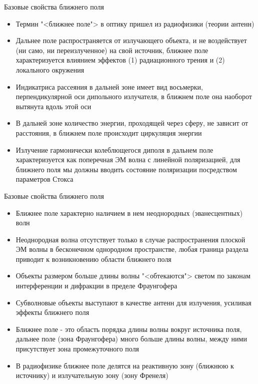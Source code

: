 \documentclass[9pt, compress, xcolor=table]{beamer}
\begin{document}
\begin{frame}{Базовые свойства ближнего поля}

\begin{itemize}
\item Термин "<ближнее поле"> в оптику пришел из радиофизики (теории антенн)
\item Дальнее поле распространяется от излучающего объекта, и не воздействует (ни само, ни переизлученное) на свой источник, ближнее поле характеризуется влиянием эффектов (1) радиационного трения и (2) локального окружения
\item Индикатриса рассеяния в дальней зоне имеет вид восьмерки, перпендикулярной оси дипольного излучателя, в ближнем поле она наоборот вытянута вдоль этой оси
\item В дальней зоне количество энергии, проходящей через сферу, не зависит от расстояния, в ближнем поле происходит циркуляция энергии
\item Излучение гармонически колеблющегося диполя в дальнем поле характеризуется как поперечная ЭМ волна с линейной поляризацией, для ближнего поля мы должны вводить состояние поляризации посредством параметров Стокса
\end{itemize}


\end{frame}

\begin{frame}{Базовые свойства ближнего поля}

\begin{itemize}

\item Ближнее поле характерно наличием в нем неоднородных (эванесцентных) волн
\item Неоднородная волна отсутствует только в случае распространения плоской ЭМ волны в бесконечном однородном пространстве, любая граница раздела приводит к возникновению области ближнего поля
\item Объекты размером больше длины волны "<обтекаются"> светом по законам интерференции и дифракции в пределе Фраунгофера
\item Субволновые объекты выступают в качестве антенн для излучения, усиливая эффекты ближнего поля
\item Ближнее поле - это область порядка длины волны вокруг источника поля, дальнее поле (зона Фраунгофера) много больше длины волны, между ними присутствует зона промежуточного поля
\item В радиофизике ближнее поле делятся на реактивную зону (ближнюю к источнику) и излучательную зону (зону Френеля)

\end{itemize} 

\end{frame}
\end{document}
